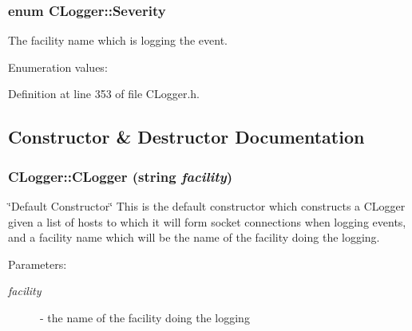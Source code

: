 \subsubsection{\setlength{\rightskip}{0pt plus 5cm}enum CLogger::Severity}\label{classCLogger_s3}


The facility name which is logging the event.

\begin{Desc}
\item[Enumeration values:]\par
\begin{description}
\item[{\em 
{\em SUCCESS}\label{classCLogger_s3s0}
}]\item[{\em 
{\em WARNING}\label{classCLogger_s3s1}
}]\item[{\em 
{\em ERROR}\label{classCLogger_s3s2}
}]\end{description}
\end{Desc}



Definition at line 353 of file CLogger.h.

\subsection{Constructor \& Destructor Documentation}
\subsubsection{\setlength{\rightskip}{0pt plus 5cm}CLogger::CLogger (string {\em facility})}\label{classCLogger_a0}


\char`\"{}Default Constructor\char`\"{} This is the default constructor which constructs a CLogger given a list of hosts to which it will form socket connections when logging events, and a facility name which will be the name of the facility doing the logging.\begin{Desc}
\item[Parameters: ]\par
\begin{description}
\item[{\em 
facility}]- the name of the facility doing the logging \end{description}
\end{Desc}


